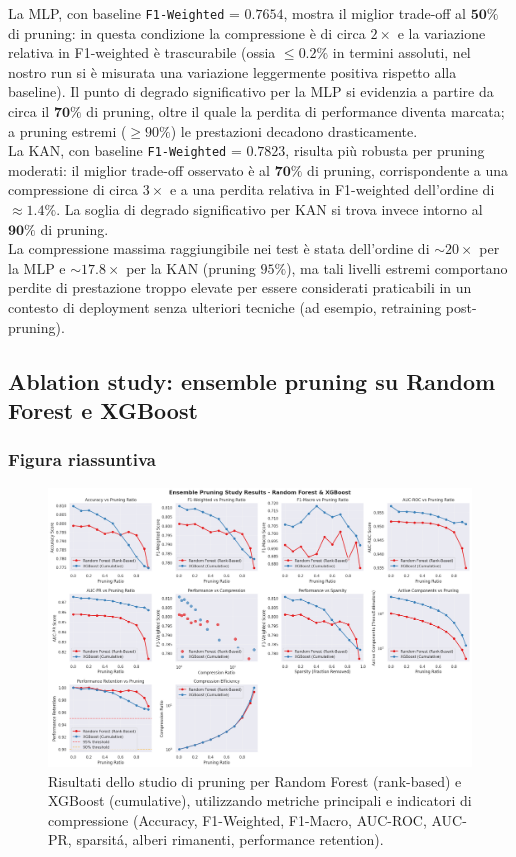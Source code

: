 \documentclass[a4paper,12pt]{report}
\begin{document}
	La MLP, con baseline \texttt{F1-Weighted} = \(\mathbf{0.7654}\), mostra il miglior trade-off al \(\mathbf{50\%}\) di pruning: in questa condizione la compressione è di circa \(2\times\) e la variazione relativa in F1-weighted è trascurabile (ossia \(\le 0.2\%\) in termini assoluti, nel nostro run si è misurata una variazione leggermente positiva rispetto alla baseline). Il punto di degrado significativo per la MLP si evidenzia a partire da circa il \(\mathbf{70\%}\) di pruning, oltre il quale la perdita di performance diventa marcata; a pruning estremi (\(\ge 90\%\)) le prestazioni decadono drasticamente. \\
	La KAN, con baseline \texttt{F1-Weighted} = \(\mathbf{0.7823}\), risulta più robusta per pruning moderati: il miglior trade-off osservato è al \(\mathbf{70\%}\) di pruning, corrispondente a una compressione di circa \(3\times\) e a una perdita relativa in F1-weighted dell'ordine di \(\approx 1.4\%\). La soglia di degrado significativo per KAN si trova invece intorno al \(\mathbf{90\%}\) di pruning. \\
	La compressione massima raggiungibile nei test è stata dell'ordine di $\sim 20\times$ per la MLP e $\sim 17.8\times$ per la KAN (pruning $95\%$), ma tali livelli estremi comportano perdite di prestazione troppo elevate per essere considerati praticabili in un contesto di deployment senza ulteriori tecniche (ad esempio, retraining post-pruning).
	
	\subsection{Ablation study: ensemble pruning su Random Forest e XGBoost}
	
	\subsubsection{Figura riassuntiva}
	\begin{figure}[H]
		\centering
		\includegraphics[width=\textwidth]{img/abl_xgbvsrf_pm.png}
		\caption{Risultati dello studio di pruning per Random Forest (rank-based) e XGBoost (cumulative), utilizzando metriche principali e indicatori di compressione (Accuracy, F1-Weighted, F1-Macro, AUC-ROC, AUC-PR, sparsitá, alberi rimanenti, performance retention).}
	\end{figure}
	
\end{document}
